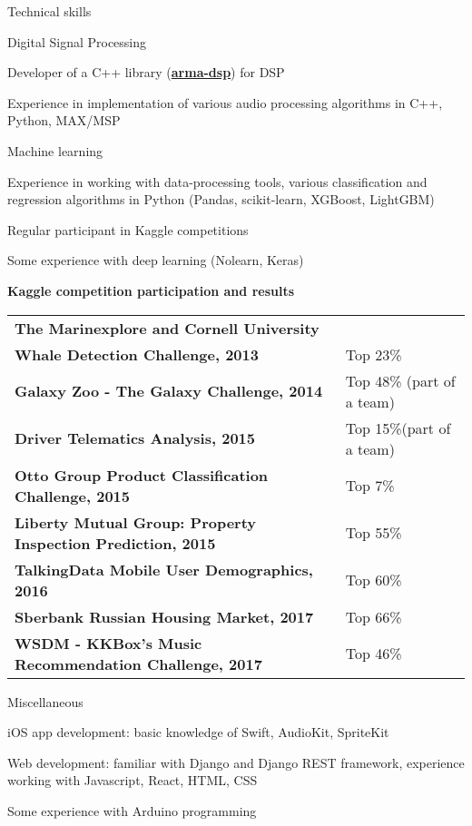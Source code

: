 \documentclass{resume} %
\begin{document}
\begin{rSection}{Technical skills}
\begin{rSubsection}{Digital Signal Processing}{}{}{}
\item Developer of a C++ library ({\bf \href{https://github.com/knstmrd/arma-dsp}{arma-dsp}}) for DSP
\item Experience in implementation of various audio processing algorithms in C++, Python, MAX/MSP
\end{rSubsection}

\begin{rSubsection}{Machine learning}{}{}{}
\item Experience in working with data-processing tools, various classification and regression algorithms in Python (Pandas, scikit-learn, XGBoost, LightGBM)
\item Regular participant in Kaggle competitions
\item Some experience with deep learning (Nolearn, Keras)
\end{rSubsection}

{\bf Kaggle competition participation and results}

\begin{tabular}{ @{} >{\bfseries}l @{\hspace{6ex}} l }

The Marinexplore and Cornell University & \\
Whale Detection Challenge, 2013 & Top 23\% \\
Galaxy Zoo - The Galaxy Challenge, 2014 & Top 48\% (part of a team) \\
Driver Telematics Analysis, 2015 & Top 15\%(part of a team) \\ 
Otto Group Product Classification Challenge, 2015 & Top 7\% \\ 
Liberty Mutual Group: Property Inspection Prediction, 2015 & Top 55\% \\
TalkingData Mobile User Demographics, 2016 & Top 60\% \\
Sberbank Russian Housing Market, 2017 & Top 66\% \\
WSDM - KKBox's Music Recommendation Challenge, 2017 & Top 46\%
\end{tabular}

\begin{rSubsection}{Miscellaneous}{}{}{}
\item iOS app development: basic knowledge of Swift, AudioKit, SpriteKit
\item Web development: familiar with Django and Django REST framework, experience working with Javascript, React, HTML, CSS
\item Some experience with Arduino programming
\end{rSubsection}

\end{rSection}
\end{document}
